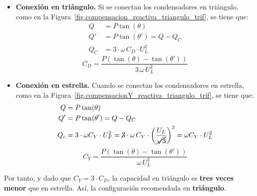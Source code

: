 \begin{itemize}
\item \textbf{Conexión en triángulo.} Si se conectan los condensadores
  en triángulo, como en la
  Figura~\ref{fig.compensacion_reactiva_triangulo_trif}, se tiene que:
  \begin{align*}
    Q &= P\tan(\theta)\\
    Q' &= P\tan(\theta') = Q - Q_C\\
    Q_C &= 3 \cdot \omega\, C_D \cdot U_L^2
  \end{align*}
  \begin{equation}
    \boxed{C_D = \frac{P(\tan (\theta) - \tan (\theta'))}{3\,\omega\, U_L^2}}
  \end{equation}
\item \textbf{Conexión en estrella.} Cuando se conectan los
  condensadores en estrella, como en la
  Figura~\ref{fig.compensacionY_reactiva_triangulo_trif}, se tiene
  que:
  \begin{align*}
    Q &= P\tan(\theta)\\
    Q' &= P\tan(\theta') = Q - Q_C\\
    Q_c &= 3 \cdot \omega C_Y \cdot U_F^2 = \cancel{3} \cdot \omega \,C_Y \cdot \left(\dfrac{U_L}{\cancel{\sqrt{3}}}\right)^2=\omega C_Y \cdot U_L^2
  \end{align*}
  \begin{equation}
    \boxed{C_Y = \frac{P(\tan (\theta) - \tan (\theta'))}{\omega\, U_L^2}}
  \end{equation}
\end{itemize}
		
		
		
Por tanto, y dado que $C_Y = 3 \cdot C_D$, la capacidad en triángulo
es \textbf{tres veces menor} que en estrella. Así, la configuración
recomendada en \textbf{triángulo}.
		
